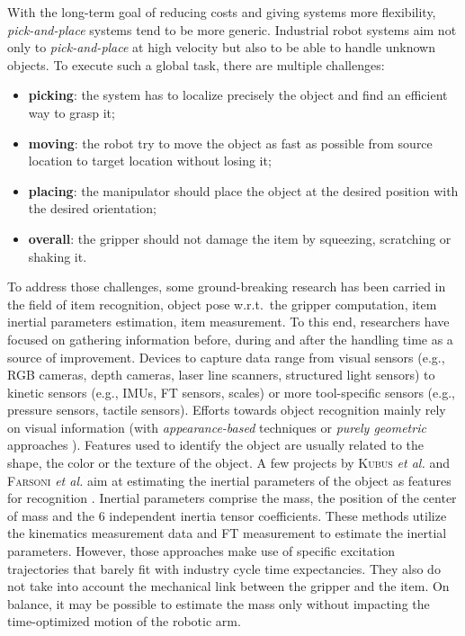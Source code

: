 \documentclass[/home/francois/latex/report/main.tex]{subfiles}
\begin{document}
With the long-term goal of reducing costs and giving systems more flexibility, \textit{pick-and-place} systems tend to be more generic. Industrial robot systems aim not only to \textit{pick-and-place} at high velocity but also to be able to handle unknown objects. To execute such a global task, there are multiple challenges:
\begin{itemize}
    \item \textbf{picking}: the system has to localize precisely the object and find an efficient way to grasp it;
    \item \textbf{moving}: the robot try to move the object as fast as possible from source location to target location without losing it;
    \item \textbf{placing}: the manipulator should place the object at the desired position with the desired orientation;
    \item \textbf{overall}: the gripper should not damage the item by squeezing, scratching or shaking it.
\end{itemize}

To address those challenges, some ground-breaking research has been carried in the field of item recognition, object pose w.r.t.\ the gripper computation, item inertial parameters estimation, item measurement. To this end, researchers have focused on gathering information before, during and after the handling time as a source of improvement. Devices to capture data range from visual sensors (e.g., RGB cameras, depth cameras, laser line scanners, structured light sensors) to kinetic sensors (e.g., \ac{IMUs}, \ac{FT} sensors, scales) or more tool-specific sensors (e.g., pressure sensors, tactile sensors). Efforts towards object recognition mainly rely on visual information (with \textit{appearance-based} techniques \cite{Carmichael2002, Schmid1997, Viola2001, Murase1993} or \textit{purely geometric} approaches \cite{Hut1987, Sethi2001}). Features used to identify the object are usually related to the shape, the color or the texture of the object. A few projects by \textsc{Kubus} \textit{et al.} and \textsc{Farsoni} \textit{et al.} aim at estimating the inertial parameters of the object as features for recognition \cite{Kubus2008, Kubus2007, Kubus2014, Farsoni2018}. Inertial parameters comprise the mass, the position of the center of mass and the 6 independent inertia tensor coefficients. These methods utilize the kinematics measurement data and \ac{FT} measurement to estimate the inertial parameters. However, those approaches make use of specific excitation trajectories that barely fit with industry cycle time expectancies. They also do not take into account the mechanical link between the gripper and the item. On balance, it may be possible to estimate the mass only without impacting the time-optimized motion of the robotic arm.
\end{document}
